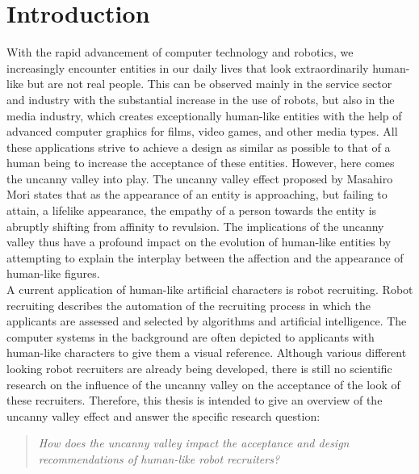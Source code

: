 \chapter{Introduction}
With the rapid advancement of computer technology and robotics, we increasingly encounter entities in our daily lives that look extraordinarily human-like but are not real people. This can be observed mainly in the service sector and industry with the substantial increase in the use of robots, but also in the media industry, which creates exceptionally human-like entities with the help of advanced computer graphics for films, video games, and other media types. All these applications strive to achieve a design as similar as possible to that of a human being to increase the acceptance of these entities. However, here comes the uncanny valley into play. The uncanny valley effect proposed by Masahiro Mori \cite{original_masahiro} states that as the appearance of an entity is approaching, but failing to attain, a lifelike appearance, the empathy of a person towards the entity is abruptly shifting from affinity to revulsion. The implications of the uncanny valley thus have a profound impact on the evolution of human-like entities by attempting to explain the interplay between the affection and the appearance of human-like figures.\\
A current application of human-like artificial characters is robot recruiting. Robot recruiting describes the automation of the recruiting process in which the applicants are assessed and selected by algorithms and artificial intelligence. The computer systems in the background are often depicted to applicants with human-like characters to give them a visual reference. Although various different looking robot recruiters are already being developed, there is still no scientific research on the influence of the uncanny valley on the acceptance of the look of these recruiters. Therefore, this thesis is intended to give an overview of the uncanny valley effect and answer the specific research question:

\begin{quote}\emph{How does the uncanny valley impact the acceptance and design recommendations of human-like robot recruiters?}\end{quote}

